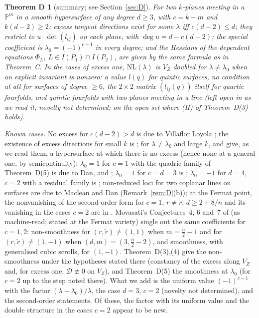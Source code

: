 \documentclass[10pt]{article}
\numberwithin{equation}{section}
\newtheorem*{thmD}{Theorem D}
\theoremstyle{remark}
\newcommand{\PP}{\mathbb{P}}
\newcommand{\NL}{\mathrm{NL}}
\newcommand{\VZ}{V_Z}
\newcommand{\cD}{\mathcal{D}}
\begin{document}
\begin{thmD}[summary; see Section~\ref{sec:D}]
For two $k$-planes meeting in a $\PP^m$ in a smooth hypersurface of any degree $d\ge3$, with $c=k-m$ and
$k(d-2)\ge2$: excess
tangent directions exist for some $\lambda$ iff $c(d-2)\le d$; they restrict to $u\cdot\det(l_{ij})$ on each
plane, with $\deg u=d-c(d-2)$; the special coefficient is $\lambda_0=(-1)^{c-1}$ in every degree; and the
Hessians of the dependent equations $\Phi_L$, $L\in I(P_1)\cap I(P_2)$, are given by the same formula as in
Theorem~C. In the cases of excess one,
$\NL(\lambda)$ is $\VZ$ doubled for $\lambda\neq\lambda_0$ when an explicit invariant is nonzero: a value $l(q)$
for quintic surfaces, no condition at all for surfaces of degree $\ge6$, the $2\times2$ matrix $(l_{ij}(q))$
itself for quartic fourfolds, and quintic fourfolds with two planes meeting in a line \textup{(}left open in
\cite[Rem.~4.9]{Kl2} as we read it; novelty not determined; on the open set where \textup{(H)} of
Theorem~D\textup{(3)} holds\textup{)}.
\end{thmD}
\emph{Known cases.} No excess for $c(d-2)>d$ is due to Villaflor Loyola \cite[Thms 1.3, 1.4]{VL}; the existence
of excess directions for small $k$ is \cite[Thm 1.3]{Kl1}; for $\lambda\ne\lambda_0$ and large $k$, \cite[Thm 1.2]{Kl1} and \cite[Thm 1.1]{Kl2} give, as we read them, a
hypersurface at which there is no excess (hence none at a general one, by semicontinuity); $\lambda_0=1$ for $c=1$ with the
quadric family of Theorem~D(5) is due to Dan, \cite[Thm 5]{Mo1} and \cite{Kl2}; $\lambda_0=1$ for $c=d=3$ is
\cite[Prop.~6.4, Cor.~6.5]{Kl1}; $\lambda_0=-1$ for $d=4$, $c=2$ with a residual family is
\cite[Prop.~6.1, Cor.~6.2]{Kl1}; non-reduced loci for two coplanar lines on surfaces are due to Maclean and Dan
(Remark~\ref{rem:D}(b)); at the Fermat point, the nonvanishing of the second-order form for $c=1$,
$r\ne\check r$, $d\ge2+8/n$ and its vanishing in the cases $c=2$ are in \cite[\S5]{DFV2}. Movasati's Conjectures~4,
6 and~7 of \cite{Mo1} (as machine-read; stated at the Fermat variety) single out the same coefficients for
$c=1,2$: non-smoothness for $(r,\check r)\ne(1,1)$ when $m=\tfrac n2-1$ and for $(r,\check r)\ne(1,-1)$ when
$(d,m)=(3,\tfrac n2-2)$, and smoothness, with generalised cubic scrolls, for $(1,-1)$. Theorem~D(3),(4) give the
non-smoothness under the hypotheses stated there (constancy of the excess along $\VZ$ and, for excess one,
$\cD\not\equiv0$ on $\VZ$), and Theorem~D(5) the smoothness at $\lambda_0$ (for $c=2$ up to the step noted
there). What we add is the uniform value $(-1)^{c-1}$ with the factor
$(\lambda-\lambda_0)/\lambda$, the case $d=3$, $c=2$ (novelty not determined), and the second-order statements.
Of these, the factor with its uniform value and the double structure in the cases $c=2$ appear to be new.
\end{document}
